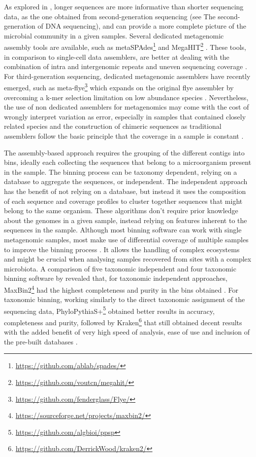 As explored in , longer sequences are more informative than shorter sequencing data, as the one obtained from second-generation sequencing (see  The second-generation of DNA sequencing), and can provide a more complete picture of the microbial community in a given samples. 
Several dedicated metagenomic assembly tools are available, such as metaSPAdes\footnote{\url{https://github.com/ablab/spades/}}  and MegaHIT\footnote{\url{https://github.com/voutcn/megahit/}} \citep{nurk_metaspades_2017, li_megahit_2015}. 
These tools, in comparison to single-cell data assemblers, are better at dealing with the combination of intra and intergenomic repeats and uneven sequencing coverage \citep{olson_metagenomic_2017}.
For third-generation sequencing, dedicated metagenomic assemblers have recently emerged, such as meta-flye\footnote{\url{https://github.com/fenderglass/Flye/}} which expands on the original flye assembler by overcoming a k-mer selection limitation on low abundance species \citep{kolmogorov_metaflye_2020}. Nevertheless, the use of non dedicated assemblers for metagenomics may come with the cost of wrongly interpret variation as error, especially in samples that contained closely related species and the construction of chimeric sequences as traditional assemblers follow the basic principle that the coverage in a sample is constant \citep{teeling_current_2012}. 

The assembly-based approach requires the grouping of the different contigs into bins, ideally each collecting the sequences that belong to a microorganism present in the sample. The binning process can be taxonomy dependent, relying on a database to aggregate the sequences, or independent. The independent approach has the benefit of not relying on a database, but instead it uses the composition of each sequence and coverage profiles to cluster together sequences that might belong to the same organism. These algorithms don’t require prior knowledge about the genomes in a given sample, instead relying on features inherent to the sequences in the sample. Although most binning software can work with single metagenomic samples, most make use of differential coverage of multiple samples to improve the binning process \citep{sedlar_bioinformatics_2017}. It allows the handling of complex ecosystems and might be crucial when analysing samples recovered from sites with a complex microbiota. A comparison of five taxonomic independent  and four taxonomic binning software by \cite{sczyrba_critical_2017} revealed that, for taxonomic independent approaches, MaxBin2\footnote{\url{https://sourceforge.net/projects/maxbin2/}} had the highest completeness and purity in the bins obtained \citep{wu_maxbin_2016}. For taxonomic binning, working similarly to the direct taxonomic assignment of the sequencing data, PhyloPythiaS+\footnote{\url{https://github.com/algbioi/ppsp}} obtained better results in accuracy, completeness and purity, followed by Kraken\footnote{\url{https://github.com/DerrickWood/kraken2/}} that still obtained decent results with the added benefit of very high speed of analysis, ease of use and inclusion of the pre-built databases \citep{gregor_phylopythias_2016, wood_kraken_2014}.
